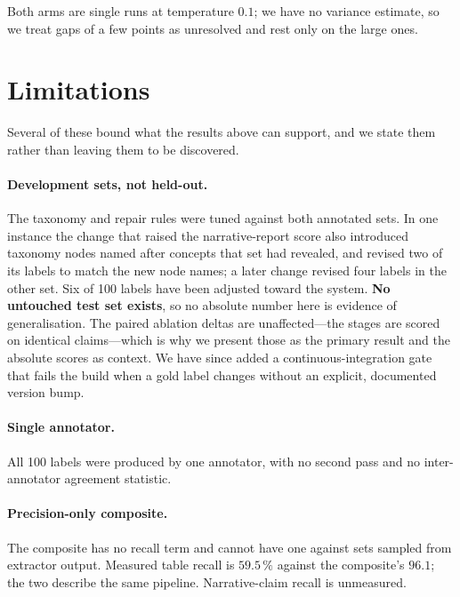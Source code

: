 \documentclass[3p,times]{elsarticle}
\begin{document}
Both arms are single runs at temperature $0.1$; we have no variance estimate, so we treat
gaps of a few points as unresolved and rest only on the large ones.

\section{Limitations}
\label{sec:limitations}

Several of these bound what the results above can support, and we state them
rather than leaving them to be discovered.

\paragraph{Development sets, not held-out.} The taxonomy and repair rules were
tuned against both annotated sets. In one instance the change that raised the
narrative-report score also introduced taxonomy nodes named after concepts that
set had revealed, and revised two of its labels to match the new node names; a
later change revised four labels in the other set. Six of 100 labels have been
adjusted toward the system. \textbf{No untouched test set exists}, so no absolute
number here is evidence of generalisation. The paired ablation deltas are
unaffected---the stages are scored on identical claims---which is why we present
those as the primary result and the absolute scores as context. We have since
added a continuous-integration gate that fails the build when a gold label
changes without an explicit, documented version bump.

\paragraph{Single annotator.} All 100 labels were produced by one annotator, with
no second pass and no inter-annotator agreement statistic.

\paragraph{Precision-only composite.} The composite has no recall term and cannot
have one against sets sampled from extractor output. Measured table recall is
$59.5\,\%$ against the composite's $96.1$; the two describe the same pipeline.
Narrative-claim recall is unmeasured.
\end{document}
